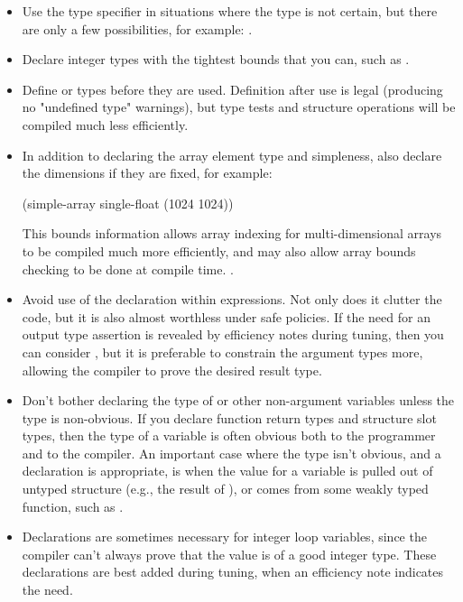 {\begin{itemize}
\item
Use the  type specifier in situations where the type is
not certain, but there are only a few possibilities, for example:
.

\item
Declare integer types with the tightest bounds that you can, such as 
.

\item
Define  or  types before they
are used.  Definition after use is legal (producing no "undefined
type" warnings), but type tests and structure operations will be
compiled much less efficiently.

\item
In addition to declaring the array element type and simpleness, also declare
the dimensions if they are fixed, for example:
\begin{example}
(simple-array single-float (1024 1024))
\end{example}
This bounds information allows array indexing for multi-dimensional arrays to
be compiled much more efficiently, and may also allow array bounds checking to
be done at compile time.  .

\item
Avoid use of the  declaration within expressions.  Not
only does it clutter the code, but it is also almost worthless under
safe policies.  If the need for an output type assertion is revealed
by efficiency notes during tuning, then you can consider , but
it is preferable to constrain the argument types more, allowing the
compiler to prove the desired result type.

\item
Don't bother declaring the type of  or other
non-argument variables unless the type is non-obvious.  If you
declare function return types and structure slot types, then the type
of a variable is often obvious both to the programmer and to the
compiler.  An important case where the type isn't obvious, and a
declaration is appropriate, is when the value for a variable is
pulled out of untyped structure (e.g., the result of ), or
comes from some weakly typed function, such as .

\item
Declarations are sometimes necessary for integer loop variables, since the
compiler can't always prove that the value is of a good integer type.  These
declarations are best added during tuning, when an efficiency note indicates
the need.
\end{itemize}


}

